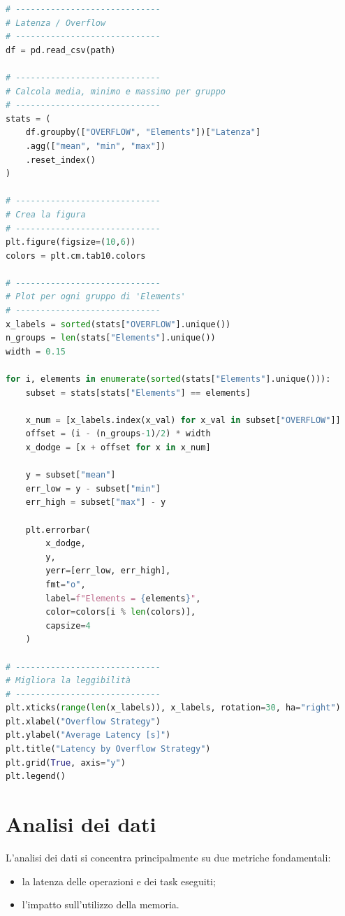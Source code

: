 \begin{lstlisting}[language=Python, caption=Esempio di script per la generazione di grafici]
# -----------------------------
# Latenza / Overflow
# -----------------------------
df = pd.read_csv(path)

# -----------------------------
# Calcola media, minimo e massimo per gruppo
# -----------------------------
stats = (
    df.groupby(["OVERFLOW", "Elements"])["Latenza"]
    .agg(["mean", "min", "max"])
    .reset_index()
)

# -----------------------------
# Crea la figura
# -----------------------------
plt.figure(figsize=(10,6))
colors = plt.cm.tab10.colors

# -----------------------------
# Plot per ogni gruppo di 'Elements'
# -----------------------------
x_labels = sorted(stats["OVERFLOW"].unique())
n_groups = len(stats["Elements"].unique())
width = 0.15

for i, elements in enumerate(sorted(stats["Elements"].unique())):
    subset = stats[stats["Elements"] == elements]

    x_num = [x_labels.index(x_val) for x_val in subset["OVERFLOW"]]
    offset = (i - (n_groups-1)/2) * width
    x_dodge = [x + offset for x in x_num]

    y = subset["mean"]
    err_low = y - subset["min"]
    err_high = subset["max"] - y

    plt.errorbar(
        x_dodge,
        y,
        yerr=[err_low, err_high],
        fmt="o",
        label=f"Elements = {elements}",
        color=colors[i % len(colors)],
        capsize=4
    )

# -----------------------------
# Migliora la leggibilità
# -----------------------------
plt.xticks(range(len(x_labels)), x_labels, rotation=30, ha="right")
plt.xlabel("Overflow Strategy")
plt.ylabel("Average Latency [s]")
plt.title("Latency by Overflow Strategy")
plt.grid(True, axis="y")
plt.legend()
\end{lstlisting}

\section{Analisi dei dati}

L'analisi dei dati si concentra principalmente su due metriche fondamentali:
\begin{itemize}
    \item la latenza delle operazioni e dei task eseguiti;
    \item l'impatto sull'utilizzo della memoria.
\end{itemize}

